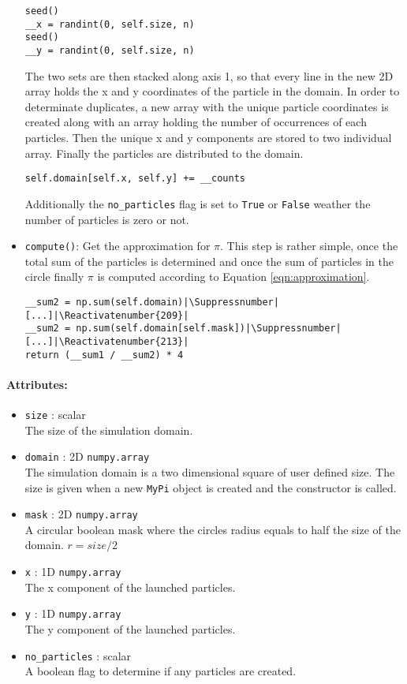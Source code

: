 \documentclass{aa}
\begin{document}
\begin{itemize}
        \begin{lstlisting}[firstnumber=151]
seed()
__x = randint(0, self.size, n)
seed()
__y = randint(0, self.size, n)
        \end{lstlisting}
        The two sets are then stacked along axis 1, so that every line in the new 2D array
        holds the x and y coordinates of the particle in the domain.
        In order to determinate duplicates, a new array with the unique particle coordinates is
        created along with an array holding the number of occurrences of each particles. Then
        the unique x and y components are stored to two individual array. Finally the particles
        are distributed to the domain.
        \begin{lstlisting}[firstnumber=176]
self.domain[self.x, self.y] += __counts
        \end{lstlisting}
        Additionally the \verb+no_particles+ flag is set to \verb+True+ or \verb+False+ weather
        the number of particles is zero or not.
    \item \verb+compute()+: Get the approximation for \(\pi\). This step is rather simple, once
        the total sum of the particles is determined and once the sum of particles in the
        circle finally \(\pi\) is computed according to Equation \ref{eqn:approximation}.
        \begin{lstlisting}[firstnumber=205]
__sum2 = np.sum(self.domain)|\Suppressnumber|
[...]|\Reactivatenumber{209}|
__sum2 = np.sum(self.domain[self.mask])|\Suppressnumber|
[...]|\Reactivatenumber{213}|
return (__sum1 / __sum2) * 4
        \end{lstlisting}
\end{itemize}

\paragraph{Attributes:}
\begin{itemize}
    \item \verb+size+ : scalar\\
        The size of the simulation domain.
    \item \verb+domain+ : 2D \verb+numpy.array+\\
        The simulation domain is a two dimensional square of user defined size. The size is
        given when a new \verb+MyPi+ object is created and the constructor is called.
    \item \verb+mask+ : 2D \verb+numpy.array+\\
        A circular boolean mask where the circles radius equals to half the size of the domain.
        \(r = size / 2\)
    \item \verb+x+ : 1D \verb+numpy.array+\\
        The x component of the launched particles.
    \item \verb+y+ : 1D \verb+numpy.array+\\
        The y component of the launched particles.
    \item \verb+no_particles+ : scalar\\
        A boolean flag to determine if any particles are created.
\end{itemize}
\end{document}
